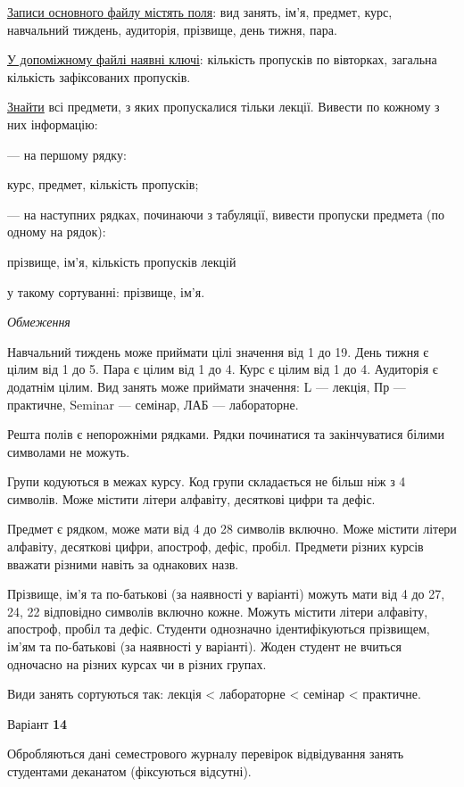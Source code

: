 \documentclass[11pt, ukrainian]{article}
\begin{document}
\underline{Записи основного файлу містять поля}: вид занять, ім’я, предмет, курс, навчальний тиждень, аудиторія, прізвище, день тижня, пара.

\underline{У допоміжному файлі наявні ключі}: кількість пропусків по вівторках, загальна кількість зафіксованих пропусків.

\underline{Знайти} всі предмети, з яких пропускалися тільки лекції. Вивести по кожному з них інформацію:\par
{\noindent}--- на першому рядку:\par
курс, предмет, кількість пропусків;

{\noindent}--- на наступних рядках, починаючи з табуляції, вивести пропуски предмета (по одному на рядок):\par
прізвище, ім’я, кількість пропусків лекцій

{\noindent}у такому сортуванні: прізвище, ім’я.


\bigskip\textit{Обмеження}

Навчальний тиждень може приймати цілі значення від 1 до 19.
День тижня є цілим від 1 до 5. Пара є цілим від 1 до 4.
Курс є цілим від 1 до 4. Аудиторія є додатнім цілим.
Вид занять може приймати значення:
L --- лекція, Пр --- практичне, Seminar --- семінар, ЛАБ --- лабораторне.

Решта полів є непорожніми рядками.
Рядки починатися та закінчуватися білими символами не можуть.

Групи кодуються в межах курсу.
Код групи складається не більш ніж з 4 символів.
Може містити літери алфавіту, десяткові цифри та дефіс.

Предмет є рядком, може мати від 4 до 28 символів включно.
Може містити літери алфавіту, десяткові цифри, апостроф, дефіс, пробіл.
Предмети різних курсів вважати різними навіть за однакових назв.

Прізвище, ім’я та по-батькові (за наявності у варіанті)
можуть мати від 4 до 27, 24, 22 відповідно символів включно кожне.
Можуть містити літери алфавіту, апостроф, пробіл та дефіс.
Студенти однозначно ідентифікуються прізвищем, ім’ям та по-батькові (за наявності у варіанті).
Жоден студент не вчиться одночасно на різних курсах чи в різних групах.

Види занять сортуються так: лекція < лабораторне < семінар < практичне.



\par
\newpage
{\center Варіант  \No \textbf { 14 }\par}
\bigskip
Обробляються дані семестрового журналу перевірок відвідування занять студентами деканатом (фіксуються відсутні). 
\end{document}
